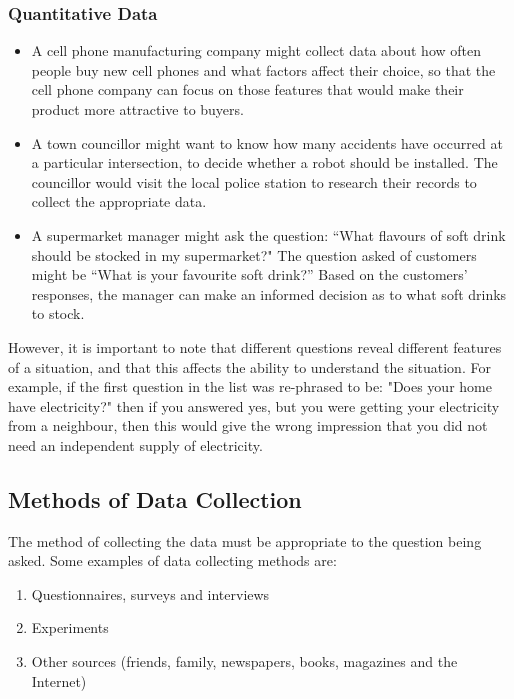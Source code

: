 \documentclass[10pt,a4paper,titlepage,twoside,openright]{report}
\begin{document}
\subsubsection*{Quantitative Data}

\begin{itemize}
\item A cell phone manufacturing company might collect data about how often people buy new cell phones and what factors affect their choice, so that the cell phone company can focus on those features that would make their product more attractive to buyers.
\item A town councillor might want to know how many accidents have occurred at a particular intersection, to decide whether a robot should be installed. The councillor would visit the local police station to research their records to collect the appropriate data.
\item A supermarket manager might ask the question: ``What flavours of soft drink should be stocked in my supermarket?" The question asked of customers might be ``What is your favourite soft drink?'' Based on the customers' responses, the manager can make an informed decision as to what soft drinks to stock.
\end{itemize}

However, it is important to note that different questions reveal different features of a situation, and that this affects the ability to understand
the situation. For example, if the first question in the list was re-phrased to be: "Does your home have electricity?" then if you answered yes, but you were getting your electricity from a neighbour, then this would give the wrong impression that you did not need an independent supply of electricity.

\subsection{Methods of Data Collection}
The method of collecting the data must be appropriate to the question being asked. Some examples of data collecting methods are:

\begin{enumerate}
\item Questionnaires, surveys and interviews
\item Experiments
\item Other sources (friends, family, newspapers, books, magazines and the Internet)
\end{enumerate}
\end{document}
